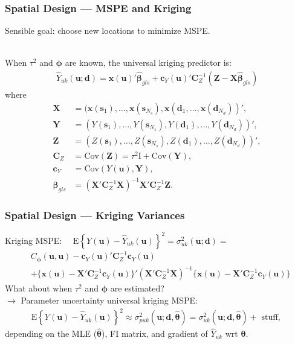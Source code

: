 \documentclass[xcolor=dvipsnames]{beamer}
\begin{document}
\begin{frame}
\frametitle{Spatial Design --- MSPE and Kriging}
Sensible goal: choose new locations to minimize MSPE. \\~\\

\pause

When $\tau^2$ and $\bm{\phi}$ are known, the universal kriging predictor is:
\begin{align*}
\widehat{Y}_{uk}(\bm{u}; \bm{d}) = \bm{x}(\bm{u})'\widehat{\bm{\beta}}_{gls} + \bm{c}_Y(\bm{u})'\bm{C}_Z^{-1}(\bm{Z} - \bm{X}\widehat{\bm{\beta}}_{gls})
\end{align*}
\citep{cressie2011statistics} where
\begin{align*}
\bm{X} &= (\bm{x}(\bm{s}_1), \dots, \bm{x}(\bm{s}_{N_s}), \bm{x}(\bm{d}_1, \dots, \bm{x}(\bm{d}_{N_d}))',\\
\bm{Y} &= (Y(\bm{s}_1), \dots, Y(\bm{s}_{N_s}), Y(\bm{d}_1), \dots, Y(\bm{d}_{N_d}))',\\
\bm{Z} &= (Z(\bm{s}_1), \dots, Z(\bm{s}_{N_s}), Z(\bm{d}_1), \dots, Z(\bm{d}_{N_d}))',\\
\bm{C}_Z &= \mathrm{Cov}(\bm{Z}) = \tau^2\bm{\mathrm{I}} + \mathrm{Cov}(\bm{Y}),\\
\bm{c}_Y &= \mathrm{Cov}(Y(\bm{u}), \bm{Y}),\\
\widehat{\bm{\beta}}_{gls} &= (\bm{X}'\bm{C}_Z^{-1}\bm{X})^{-1}\bm{X}'\bm{C}_Z^{-1}\bm{Z}.
\end{align*}
\end{frame}

\begin{frame}
\frametitle{Spatial Design --- Kriging Variances}
Kriging MSPE: \ \ $\mathrm{E}\left\{Y(\bm{u}) - \widehat{Y}_{uk}(\bm{u})\right\}^2 = \sigma_{uk}^2(\bm{u};\bm{d})=$
\begin{align*}
&C_{\bm{\phi}}(\bm{u}, \bm{u}) - \bm{c}_Y(\bm{u})'\bm{C}_Z^{-1}\bm{c}_Y(\bm{u})\\
& + \{\bm{x}(\bm{u})  - \bm{X}'\bm{C}_Z^{-1}\bm{c}_Y(\bm{u})\}'(\bm{X}'\bm{C}_Z^{-1}\bm{X})^{-1}\{\bm{x}(\bm{u})  - \bm{X}'\bm{C}_Z^{-1}\bm{c}_Y(\bm{u})\}
\end{align*}
\pause
What about when $\tau^2$ and $\bm{\phi}$ are estimated? \pause\\
$\to$ Parameter uncertainty universal kriging MSPE:
\begin{align*}
\mathrm{E}\left\{Y(\bm{u}) - \widehat{Y}_{uk}(\bm{u})\right\}^2 \approx \sigma^2_{puk}(\bm{u};\bm{d},\widehat{\bm{\theta}}) = \sigma^2_{uk}(\bm{u};\bm{d},\widehat{\bm{\theta}}) + \mbox{ stuff, }
\end{align*}
depending on the MLE ($\widehat{\bm{\theta}}$), FI matrix, and gradient
of $\widehat{Y}_{uk}$ wrt $\bm{\theta}$.\\ \citep{zimmerman1992mean,abt1999estimating}
\end{frame}
\end{document}

